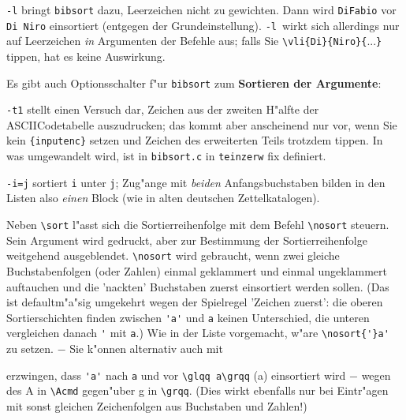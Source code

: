 \documentclass[12pt,a4paper]{article}
\begin{document}
\verb|-l| bringt \verb|bibsort| dazu, Leerzeichen nicht zu gewichten. 
Dann wird \verb|DiFabio| vor \verb|Di Niro| einsortiert (entgegen der
Grundeinstellung). \verb|-l|~wirkt sich allerdings nur auf Leerzeichen 
\textit{in} Argumenten der \BibArts\hy Befehle aus; falls Sie 
\verb|\vli{Di}{Niro}{|...\verb|}| tippen, hat es keine Auswirkung.



\vspace{2ex}\noindent
Es gibt auch Optionsschalter f"ur \verb|bibsort| zum
\textbf{Sortieren der Argumente}:

\vspace{.15ex}
\verb|-t1| stellt einen Versuch dar, Zeichen aus der zweiten
H"alfte der ASCII\hy Codetabelle auszudrucken; das kommt aber
anscheinend nur vor, wenn Sie kein \verb|{inputenc}| setzen
und Zeichen des erweiterten Teils trotzdem tippen. In was
umgewandelt wird, ist in \verb|bibsort.c| in \verb|teinzerw| fix 
definiert. 

\vspace{.05ex}
\verb|-i=j| sortiert \verb|i| unter \verb|j|; Zug"ange mit  
\textit{beiden} Anfangsbuchstaben bilden in den Listen also 
\textit{einen} Block (wie in alten deutschen Zettelkatalogen).


\vspace{1.5ex}\noindent
Neben \verb|\sort|  l"asst sich die Sortierreihenfolge
mit dem Befehl \verb|\nosort| steuern. Sein Argument wird gedruckt, 
aber zur Bestimmung der Sortierreihenfolge weitgehend ausgeblendet. 
\verb|\nosort| wird gebraucht, wenn zwei gleiche Buchstabenfolgen 
(oder Zahlen) einmal geklammert und einmal ungeklammert auftauchen 
und die 'nackten' Buchstaben zuerst einsortiert werden sollen. (Das 
ist defaultm"a"sig umgekehrt wegen der Spielregel 'Zeichen zuerst':
die oberen Sortierschichten finden zwischen \verb|'a'| und \verb|a| 
keinen Unterschied, die unteren vergleichen danach \verb|'| mit 
\verb|a|.) Wie in der Liste vorgemacht, w"are \verb|\nosort{'}a'|
zu setzen. $-$ Sie k"onnen alternativ auch mit


\vspace{-1.5ex}\noindent
erzwingen, dass \verb|'a'| nach \verb|a| und vor \verb|\glqq a\grqq| 
(\glqq a\grqq) einsortiert wird $-$
wegen des A in \verb|\Acmd| gegen"uber g in \verb|\grqq|.
(Dies wirkt ebenfalls nur bei Eintr"agen mit sonst gleichen 
Zeichenfolgen aus Buchstaben und Zahlen!)
\end{document}
